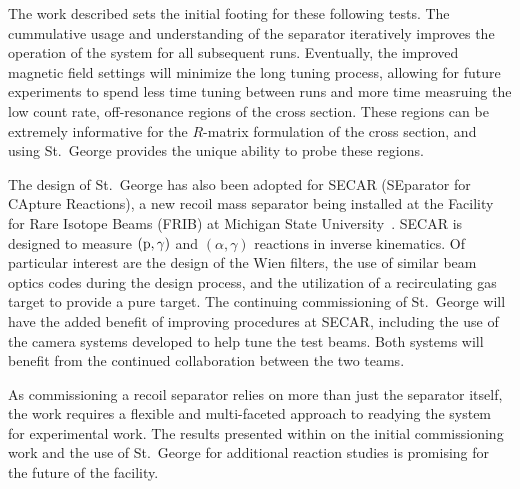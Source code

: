 The work described sets the initial footing for these following tests.
The cummulative usage and understanding of the separator iteratively
improves the operation of the system for all subsequent runs.
Eventually, the improved magnetic field settings will minimize the long
tuning process, allowing for future experiments to spend less time
tuning between runs and more time measruing the low count rate,
off-resonance regions of the cross section. These regions can be
extremely informative for the $R$-matrix formulation of the cross
section, and using St.\ George provides the unique ability to probe
these regions.

The design of St.\ George has also been adopted for SECAR (SEparator for
CApture Reactions), a new recoil mass separator being installed at the
Facility for Rare Isotope Beams (FRIB) at Michigan State
University~\cite{Berg2018}. SECAR is designed to measure
$({\rm p},\gamma)$ and $(\alpha,\gamma)$ reactions in inverse
kinematics. Of particular interest are the design of the Wien filters,
the use of similar beam optics codes during the design process, and the
utilization of a recirculating gas target to provide a pure target. The
continuing commissioning of St.\ George will have the added benefit of
improving procedures at SECAR, including the use of the camera systems
developed to help tune the test beams. Both systems will benefit from
the continued collaboration between the two teams.

As commissioning a recoil separator relies on more than just the
separator itself, the work requires a flexible and multi-faceted
approach to readying the system for experimental work. The results
presented within on the initial commissioning work and the use of St.\
George for additional reaction studies is promising for the future of
the facility.
